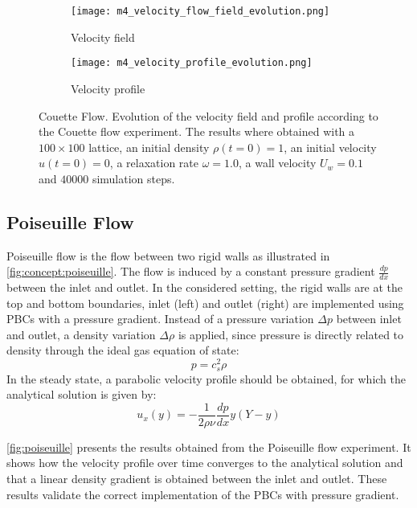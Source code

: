 \begin{figure}[ht!]
    \begin{subfigure}{\linewidth}
        \centering
        \texttt{[image: m4\_velocity\_flow\_field\_evolution.png]}
        \caption{Velocity field}
        \label{fig:couette:flow-field}
    \end{subfigure}

    \begin{subfigure}{\linewidth}
        \centering
        \texttt{[image: m4\_velocity\_profile\_evolution.png]}
        \caption{Velocity profile}
        \label{fig:couette:profile}
    \end{subfigure}
    \caption[Couette Flow]{Couette Flow. Evolution of the velocity field and profile according to the Couette flow experiment. The results where obtained with a $100\times100$ lattice, an initial density $\rho(t=0)=1$, an initial velocity $u(t=0)=0$, a relaxation rate $\omega=1.0$, a wall velocity $U_w=0.1$ and $40000$ simulation steps.}
    \label{fig:couette}
\end{figure}

\subsection{Poiseuille Flow}

Poiseuille flow is the flow between two rigid walls as illustrated in \cref{fig:concept:poiseuille}. The flow is induced by a constant pressure gradient $\frac{dp}{dx}$ between the inlet and outlet. In the considered setting, the rigid walls are at the top and bottom boundaries, inlet (left) and outlet (right) are implemented using \glspl{PBC} with a pressure gradient. Instead of a pressure variation $\Delta p$ between inlet and outlet, a density variation $\Delta \rho$ is applied, since pressure is directly related to density through the ideal gas equation of state:
\begin{equation}
    p = c_s^2 \rho
    \label{eq:pressure-density-relation}
\end{equation}
In the steady state, a parabolic velocity profile should be obtained, for which the analytical solution is given by:
\begin{equation}
    u_x(y) = - \frac{1}{2\rho\nu} \frac{dp}{dx} y (Y-y)
    \label{eq:poiseuille:analytical-solution}
\end{equation}

\cref{fig:poiseuille} presents the results obtained from the Poiseuille flow experiment. It shows how the velocity profile over time converges to the analytical solution and that a linear density gradient is obtained between the inlet and outlet. These results validate the correct implementation of the \glspl{PBC} with pressure gradient.

